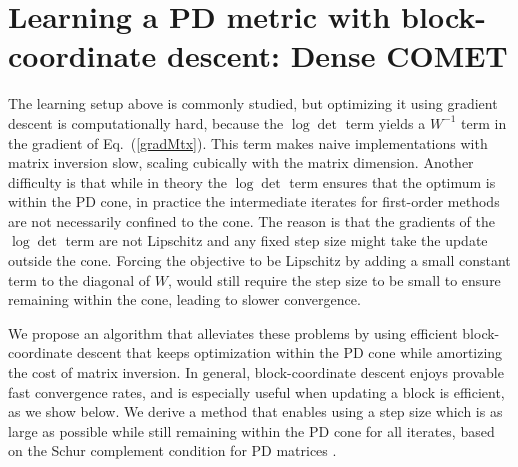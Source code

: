 \documentclass[twoside,11pt]{article}
\newcommand\mat[1]{{#1}}
\newcommand{\W}{\mat{W}}
\newcommand{\newW}{{\mat{W^{new}}}}
\renewcommand{\eqref}[1]{Eq.~(\ref{#1})}
\begin{document}
\section{Learning a PD metric with block-coordinate descent: Dense COMET}
\label{learing_dense_comet}
\vskip -5pt
The learning setup above is commonly studied, but 
optimizing it using gradient descent is computationally hard, because the $\log \det$ term yields a $\W^{-1}$ term in the gradient of \eqref{gradMtx}. This term makes naive implementations with matrix inversion slow, scaling cubically with the matrix dimension. Another difficulty is that while in theory the $\log \det$ term ensures that the optimum is within the PD cone, in practice the intermediate iterates for first-order methods are not necessarily confined to the cone. The reason is that the gradients of the $\log \det$ term are not Lipschitz and any fixed step size might take the update outside the cone. Forcing the objective to be Lipschitz by adding a small constant term to the diagonal of $\W$, would still require the step size to be small to ensure remaining within the cone, leading to slower convergence. 

We propose an algorithm that alleviates these problems by using efficient block-coordinate descent that keeps optimization within the PD cone while  amortizing the cost of matrix inversion.
In general, block-coordinate descent enjoys provable fast convergence rates, and is especially useful when updating a block is efficient, as we show below. We derive a method that enables using a step size which is as large as possible while still remaining within the PD cone for all iterates, based on the Schur complement condition for PD matrices \citep[p. 650]{boyd2004convex}.

\end{document}
